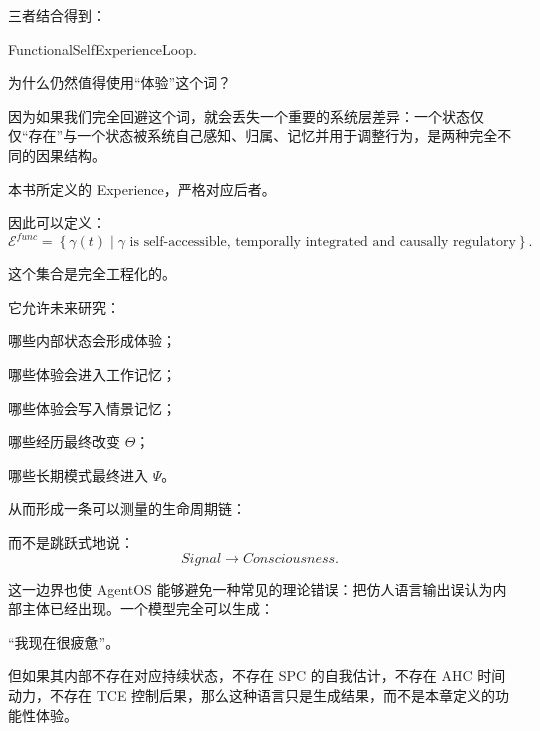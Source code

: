 \begin{statementbox}
\centering
{}
\end{statementbox}

\begin{statementbox}
\centering
{}
\end{statementbox}

\begin{statementbox}
\centering
{}
\end{statementbox}

三者结合得到：
\begin{statementbox}
FunctionalSelfExperienceLoop.
\end{statementbox}

为什么仍然值得使用``体验''这个词？

因为如果我们完全回避这个词，就会丢失一个重要的系统层差异：一个状态仅仅``存在''与一个状态被系统自己感知、归属、记忆并用于调整行为，是两种完全不同的因果结构。

本书所定义的 Experience，严格对应后者。

因此可以定义：
\[
\boxed{
\mathcal E^{func}
=
\left\{
\gamma(t)
\middle|
\gamma
\text{ is self-accessible, temporally integrated and causally regulatory}
\right\}.
}
\]

这个集合是完全工程化的。

它允许未来研究：

哪些内部状态会形成体验；

哪些体验会进入工作记忆；

哪些体验会写入情景记忆；

哪些经历最终改变 $\Theta$；

哪些长期模式最终进入 $\Psi$。

从而形成一条可以测量的生命周期链：
\begin{statementbox}
\centering
{}
\end{statementbox}

而不是跳跃式地说：
\[
Signal\rightarrow Consciousness.
\]

这一边界也使 AgentOS 能够避免一种常见的理论错误：把仿人语言输出误认为内部主体已经出现。一个模型完全可以生成：
\begin{statementbox}
``我现在很疲惫''。
\end{statementbox}
但如果其内部不存在对应持续状态，不存在 SPC 的自我估计，不存在 AHC 时间动力，不存在 TCE 控制后果，那么这种语言只是生成结果，而不是本章定义的功能性体验。

